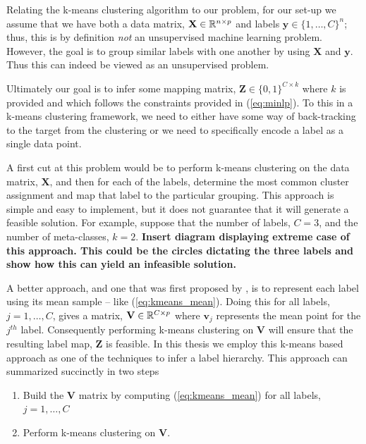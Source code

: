 \documentclass[../thesis.tex]{subfiles}
\begin{document}
Relating the k-means clustering algorithm to our problem, for our set-up we
assume that we have both a data matrix, $\mathbf{X} \in \mathbb{R}^{n \times p}$ and
labels $\mathbf{y} \in \{1, \ldots, C\}^n$; thus, this is by definition
\textit{not} an unsupervised machine learning problem. However, the goal is to
group similar labels with one another by using $\mathbf{X}$ and $\mathbf{y}$.
Thus this can indeed be viewed as an unsupervised problem.

Ultimately our goal is to infer some mapping matrix, $\mathbf{Z} \in \{0, 1\}^{C
\times k}$ where $k$ is provided and which follows the constraints provided in
(\ref{eq:minlp}). To this in a k-means clustering framework, we need to either
have some way of back-tracking to the target from the clustering or we need to
specifically encode a label as a single data point.

A first cut at this problem would be to perform k-means clustering on the data
matrix, $\mathbf{X}$, and then for each of the labels, determine the most common
cluster assignment and map that label to the particular grouping. This approach
is simple and easy to implement, but it does not guarantee that it will generate
a feasible solution. For example, suppose that the number of labels, $C = 3$,
and the number of meta-classes, $k=2$. \textbf{Insert diagram displaying extreme
case of this approach. This could be the circles dictating the three labels and
show how this can yield an infeasible solution.}

A better approach, and one that was first proposed by
\cite{vural2004hierarchical}, is to represent each label using its mean sample --
like (\ref{eq:kmeans_mean}). Doing this for all labels, $j = 1, \ldots, C$,
gives a matrix, $\mathbf{V} \in \mathbb{R}^{C \times p}$ where $\mathbf{v}_j$ represents
the mean point for the $j^{th}$ label. Consequently performing k-means
clustering on $\mathbf{V}$ will ensure that the resulting label map,
$\mathbf{Z}$ is feasible. In this thesis we employ this k-means based approach
as one of the techniques to infer a label hierarchy. This approach can
summarized succinctly in two steps
\begin{enumerate}
    \item Build the $\mathbf{V}$ matrix by computing (\ref{eq:kmeans_mean}) for
    all labels, $j = 1, \ldots, C$
    \item Perform k-means clustering on $\mathbf{V}$.
\end{enumerate}
\end{document}
